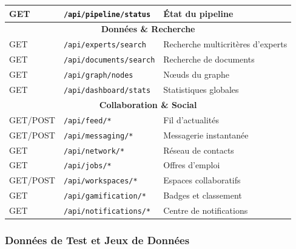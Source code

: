 \documentclass[12pt,a4paper]{article}
\begin{document}
\begin{center}
\begin{tabular}{|l|l|l|}
\hline
GET & \texttt{/api/pipeline/status} & État du pipeline \\
\hline
\multicolumn{3}{|c|}{\cellcolor{grisclair}\textbf{Données \& Recherche}} \\
\hline
GET & \texttt{/api/experts/search} & Recherche multicritères d'experts \\
\hline
GET & \texttt{/api/documents/search} & Recherche de documents \\
\hline
GET & \texttt{/api/graph/nodes} & Nœuds du graphe \\
\hline
GET & \texttt{/api/dashboard/stats} & Statistiques globales \\
\hline
\multicolumn{3}{|c|}{\cellcolor{grisclair}\textbf{Collaboration \& Social}} \\
\hline
GET/POST & \texttt{/api/feed/*} & Fil d'actualités \\
\hline
GET/POST & \texttt{/api/messaging/*} & Messagerie instantanée \\
\hline
GET & \texttt{/api/network/*} & Réseau de contacts \\
\hline
GET & \texttt{/api/jobs/*} & Offres d'emploi \\
\hline
GET/POST & \texttt{/api/workspaces/*} & Espaces collaboratifs \\
\hline
GET & \texttt{/api/gamification/*} & Badges et classement \\
\hline
GET & \texttt{/api/notifications/*} & Centre de notifications \\
\hline
\end{tabular}
\end{center}

\subsubsection{Données de Test et Jeux de Données}
\end{document}
